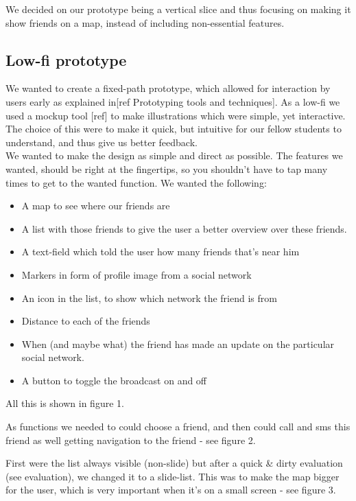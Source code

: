 \documentclass[runningheads,a4paper]{llncs}
\begin{document}
We decided on our prototype being a vertical slice and thus focusing on making it show friends on a map, instead of including non-essential features. 

\subsection{Low-fi prototype}
We wanted to create a fixed-path prototype, which allowed for interaction by users early as explained in[ref Prototyping tools and techniques]. As a low-fi we used a mockup tool [ref] to make illustrations which were simple, yet interactive. The choice of this were to make it quick, but intuitive for our fellow students to understand, and thus give us better feedback. \\

We wanted to make the design as simple and direct as possible. The features we wanted, should be right at the fingertips, so you shouldn’t have to tap many times to get to the wanted function. 
We wanted the following: 
\begin{itemize}
  	\item A map to see where our friends are 
	\item A list with those friends to give the user a better overview over these friends. 
	\item A text-field which told the user how many friends that’s near him
	\item Markers in form of profile image from a social network
	\item An icon in the list, to show which network the friend is from
	\item Distance to each of the friends
	\item When (and maybe what) the friend has made an update on the particular social network.
	\item A button to toggle the broadcast on and off\\ 
\end{itemize}

All this is shown in figure 1. 

As functions we needed to could choose a friend, and then could call and sms this friend as well getting navigation to the friend - see figure 2. 

First were the list always visible (non-slide) but after a quick \& dirty evaluation (see evaluation), we changed it to a slide-list. This was to make the map bigger for the user, which is very important when it’s on a small screen - see figure 3. 
\end{document}
